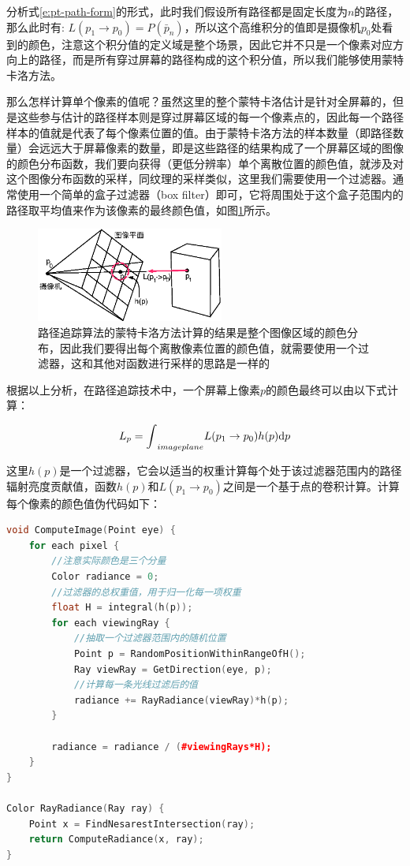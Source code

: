 分析式\ref{e:pt-path-form}的形式，此时我们假设所有路径都是固定长度为$n$的路径，那么此时有: $L(p_1\to p_0)=P(\bar{p}_n)$，所以这个高维积分的值即是摄像机$p_0$处看到的颜色，注意这个积分值的定义域是整个场景，因此它并不只是一个像素对应方向上的路径，而是所有穿过屏幕的路径构成的这个积分值，所以我们能够使用蒙特卡洛方法。

那么怎样计算单个像素的值呢？虽然这里的整个蒙特卡洛估计是针对全屏幕的，但是这些参与估计的路径样本则是穿过屏幕区域的每一个像素点的，因此每一个路径样本的值就是代表了每个像素位置的值。由于蒙特卡洛方法的样本数量（即路径数量）会远远大于屏幕像素的数量，即是这些路径的结果构成了一个屏幕区域的图像的颜色分布函数，我们要向获得（更低分辨率）单个离散位置的颜色值，就涉及对这个图像分布函数的采样，同纹理的采样类似，这里我们需要使用一个过滤器。通常使用一个简单的盒子过滤器（box filter）即可，它将周围处于这个盒子范围内的路径取平均值来作为该像素的最终颜色值，如图\ref{f:pt-ray-set-up}所示。

\begin{figure}
	\sidecaption
	\includegraphics[width=0.55\textwidth]{figures/pt/ray-set-up}
	\caption{路径追踪算法的蒙特卡洛方法计算的结果是整个图像区域的颜色分布，因此我们要得出每个离散像素位置的颜色值，就需要使用一个过滤器，这和其他对函数进行采样的思路是一样的}
	\label{f:pt-ray-set-up}
\end{figure}

根据以上分析，在路径追踪技术中，一个屏幕上像素$p$的颜色最终可以由以下式计算：

\begin{equation}
	L_p={\rm \int}_{imageplane}L(p_1\to p_0)h(p){\rm d}p
\end{equation}

这里$h(p)$是一个过滤器，它会以适当的权重计算每个处于该过滤器范围内的路径辐射亮度贡献值，函数$h(p)$和$L(p_1\to p_0)$之间是一个基于点的卷积计算。计算每个像素的颜色值伪代码如下：

\begin{lstlisting}[language=C++,mathescape]
void ComputeImage(Point eye) {
	for each pixel {
		//注意实际颜色是三个分量
		Color radiance = 0;
		//过滤器的总权重值，用于归一化每一项权重         
		float H = integral(h(p));   
		for each viewingRay {
			//抽取一个过滤器范围内的随机位置
			Point p = RandomPositionWithinRangeOfH(); 
			Ray viewRay = GetDirection(eye, p);
			//计算每一条光线过滤后的值
			radiance += RayRadiance(viewRay)*h(p); 
		}
			
		radiance = radiance / (#viewingRays*H);
	}
}
	
Color RayRadiance(Ray ray) {
	Point x = FindNesarestIntersection(ray);
	return ComputeRadiance(x, ray);
}
\end{lstlisting}


